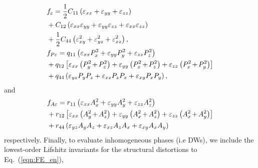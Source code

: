\documentclass[%
 reprint,
superscriptaddress,
 amsmath,amssymb,
prb,
]{revtex4-1}
\begin{document}
\begin{align}
    &f_\varepsilon = \frac{1}{2} C_{11} \left(\varepsilon_{xx} + \varepsilon_{yy} + \varepsilon_{zz} \right) \\ \nonumber
    &+ C_{12} \left(\varepsilon_{xx} \varepsilon_{yy} + \varepsilon_{yy} \varepsilon_{zz} + \varepsilon_{xx} \varepsilon_{zz} \right) \\ \nonumber
    &+ \frac{1}{2} C_{44} \left(\varepsilon_{xy}^2 + \varepsilon_{yz}^2 + \varepsilon_{xz}^2 \right), \\ \nonumber
    &f_{P\varepsilon} = q_{11} \left(\varepsilon_{xx} P_x^2 + \varepsilon_{yy} P_y^2 + \varepsilon_{zz} P_z^2\right) \\ \nonumber
    &+ q_{12} \left[\varepsilon_{xx} \left(P_y^2\hspace*{-1pt} + \hspace*{-1pt}P_z^2\right) + \varepsilon_{yy} \left(P_x^2\hspace*{-1pt} + \hspace*{-1pt}P_z^2\right) + \varepsilon_{zz} \left(P_x^2\hspace*{-1pt} + \hspace*{-1pt}P_y^2\right) \right]\\ \nonumber
    &+ q_{44} \left(\varepsilon_{yz} P_y P_z + \varepsilon_{xz} P_z P_x + \varepsilon_{xy} P_x P_y\right),
\end{align}
%
and
%
\begin{align}\label{eqn:FE_roto}
    &f_{A\varepsilon} = r_{11} \left(\varepsilon_{xx} A_x^2 + \varepsilon_{yy} A_y^2 + \varepsilon_{zz} A_z^2\right)\\ \nonumber
    &+ r_{12} \left[\varepsilon_{xx} \left(A_y^2\hspace*{-1pt} + \hspace*{-1pt}A_z^2\right) + \varepsilon_{yy} \left(A_x^2\hspace*{-1pt} + \hspace*{-1pt}A_z^2\right) + \varepsilon_{zz} \left(A_x^2\hspace*{-1pt} +\hspace*{-1pt} A_y^2\right)\right]\\ \nonumber
    &+ r_{44} \left(\varepsilon_{yz} A_y A_z + \varepsilon_{xz} A_z A_x + \varepsilon_{xy} A_x A_y\right)
\end{align}
%
respectively. 
%
Finally, to evaluate inhomogeneous phases (i.e DWs), we include the lowest-order Lifshitz invariants \cite{Cao1990, Li2001, Hlinka2006} for the structural distortions to Eq.~(\ref{eqn:FE_en}),
%
\end{document}
